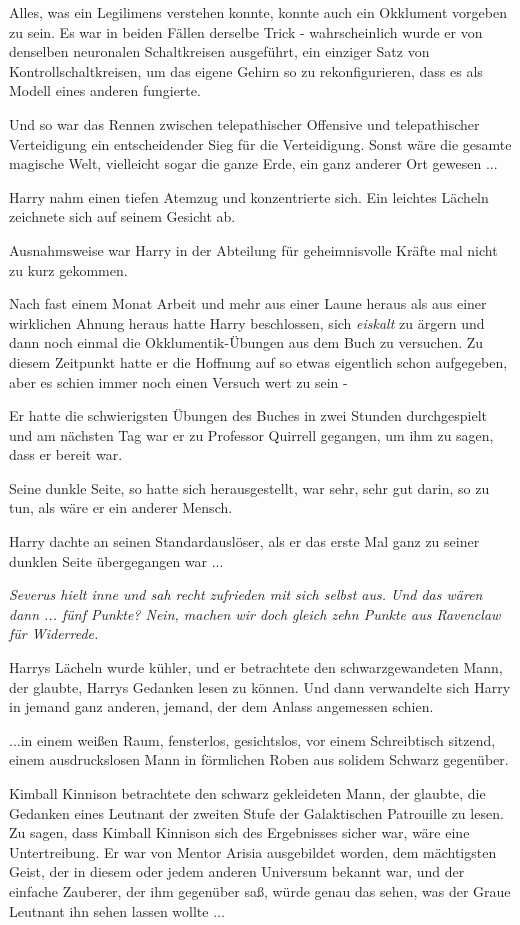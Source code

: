 Alles, was ein Legilimens verstehen konnte, konnte auch ein Okklument vorgeben
zu sein. Es war in beiden Fällen derselbe Trick - wahrscheinlich wurde er von
denselben neuronalen Schaltkreisen ausgeführt, ein einziger Satz von
Kontrollschaltkreisen, um das eigene Gehirn so zu rekonfigurieren, dass es als
Modell eines anderen fungierte.

Und so war das Rennen zwischen telepathischer Offensive und telepathischer
Verteidigung ein entscheidender Sieg für die Verteidigung. Sonst wäre die
gesamte magische Welt, vielleicht sogar die ganze Erde, ein ganz anderer Ort
gewesen ...

Harry nahm einen tiefen Atemzug und konzentrierte sich. Ein leichtes Lächeln
zeichnete sich auf seinem Gesicht ab.

Ausnahmsweise war Harry in der Abteilung für geheimnisvolle Kräfte mal nicht zu
kurz gekommen.

Nach fast einem Monat Arbeit und mehr aus einer Laune heraus als aus einer
wirklichen Ahnung heraus hatte Harry beschlossen, sich \emph{eiskalt} zu ärgern
und dann noch einmal die Okklumentik-Übungen aus dem Buch zu versuchen. Zu
diesem Zeitpunkt hatte er die Hoffnung auf so etwas eigentlich schon aufgegeben,
aber es schien immer noch einen Versuch wert zu sein -

Er hatte die schwierigsten Übungen des Buches in zwei Stunden durchgespielt und
am nächsten Tag war er zu Professor Quirrell gegangen, um ihm zu sagen, dass er
bereit war.

Seine dunkle Seite, so hatte sich herausgestellt, war sehr, sehr gut darin, so
zu tun, als wäre er ein anderer Mensch.

Harry dachte an seinen Standardauslöser, als er das erste Mal ganz zu seiner
dunklen Seite übergegangen war ...

\emph{Severus hielt inne und sah recht zufrieden mit sich selbst aus. \glqq{}
Und das wären dann ... fünf Punkte? Nein, machen wir doch gleich zehn Punkte aus
Ravenclaw für Widerrede.\grqq{}}

Harrys Lächeln wurde kühler, und er betrachtete den schwarzgewandeten Mann, der
glaubte, Harrys Gedanken lesen zu können. Und dann verwandelte sich Harry in
jemand ganz anderen, jemand, der dem Anlass angemessen schien.

...in einem weißen Raum, fensterlos, gesichtslos, vor einem Schreibtisch
sitzend, einem ausdruckslosen Mann in förmlichen Roben aus solidem Schwarz
gegenüber.

Kimball Kinnison betrachtete den schwarz gekleideten Mann, der glaubte, die
Gedanken eines Leutnant der zweiten Stufe der Galaktischen Patrouille zu lesen.
Zu sagen, dass Kimball Kinnison sich des Ergebnisses sicher war, wäre eine
Untertreibung. Er war von Mentor Arisia ausgebildet worden, dem mächtigsten
Geist, der in diesem oder jedem anderen Universum bekannt war, und der einfache
Zauberer, der ihm gegenüber saß, würde genau das sehen, was der Graue Leutnant
ihn sehen lassen wollte ...

